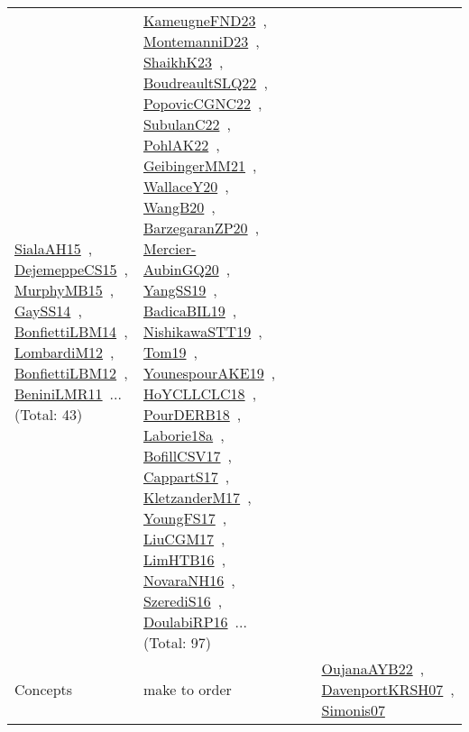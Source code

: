 {\begin{longtable}{lp{3cm}>{\raggedright\arraybackslash}p{6cm}>{\raggedright\arraybackslash}p{6cm}>{\raggedright\arraybackslash}p{8cm}}
\href{works/SialaAH15.pdf}{SialaAH15}~\cite{SialaAH15}, \href{works/DejemeppeCS15.pdf}{DejemeppeCS15}~\cite{DejemeppeCS15}, \href{works/MurphyMB15.pdf}{MurphyMB15}~\cite{MurphyMB15}, \href{works/GaySS14.pdf}{GaySS14}~\cite{GaySS14}, \href{works/BonfiettiLBM14.pdf}{BonfiettiLBM14}~\cite{BonfiettiLBM14}, \href{works/LombardiM12.pdf}{LombardiM12}~\cite{LombardiM12}, \href{works/BonfiettiLBM12.pdf}{BonfiettiLBM12}~\cite{BonfiettiLBM12}, \href{works/BeniniLMR11.pdf}{BeniniLMR11}~\cite{BeniniLMR11}... (Total: 43) & \href{works/KameugneFND23.pdf}{KameugneFND23}~\cite{KameugneFND23}, \href{works/MontemanniD23.pdf}{MontemanniD23}~\cite{MontemanniD23}, \href{works/ShaikhK23.pdf}{ShaikhK23}~\cite{ShaikhK23}, \href{works/BoudreaultSLQ22.pdf}{BoudreaultSLQ22}~\cite{BoudreaultSLQ22}, \href{works/PopovicCGNC22.pdf}{PopovicCGNC22}~\cite{PopovicCGNC22}, \href{works/SubulanC22.pdf}{SubulanC22}~\cite{SubulanC22}, \href{works/PohlAK22.pdf}{PohlAK22}~\cite{PohlAK22}, \href{works/GeibingerMM21.pdf}{GeibingerMM21}~\cite{GeibingerMM21}, \href{works/WallaceY20.pdf}{WallaceY20}~\cite{WallaceY20}, \href{works/WangB20.pdf}{WangB20}~\cite{WangB20}, \href{works/BarzegaranZP20.pdf}{BarzegaranZP20}~\cite{BarzegaranZP20}, \href{works/Mercier-AubinGQ20.pdf}{Mercier-AubinGQ20}~\cite{Mercier-AubinGQ20}, \href{works/YangSS19.pdf}{YangSS19}~\cite{YangSS19}, \href{works/BadicaBIL19.pdf}{BadicaBIL19}~\cite{BadicaBIL19}, \href{works/NishikawaSTT19.pdf}{NishikawaSTT19}~\cite{NishikawaSTT19}, \href{works/Tom19.pdf}{Tom19}~\cite{Tom19}, \href{works/YounespourAKE19.pdf}{YounespourAKE19}~\cite{YounespourAKE19}, \href{works/HoYCLLCLC18.pdf}{HoYCLLCLC18}~\cite{HoYCLLCLC18}, \href{works/PourDERB18.pdf}{PourDERB18}~\cite{PourDERB18}, \href{works/Laborie18a.pdf}{Laborie18a}~\cite{Laborie18a}, \href{works/BofillCSV17.pdf}{BofillCSV17}~\cite{BofillCSV17}, \href{works/CappartS17.pdf}{CappartS17}~\cite{CappartS17}, \href{works/KletzanderM17.pdf}{KletzanderM17}~\cite{KletzanderM17}, \href{works/YoungFS17.pdf}{YoungFS17}~\cite{YoungFS17}, \href{works/LiuCGM17.pdf}{LiuCGM17}~\cite{LiuCGM17}, \href{works/LimHTB16.pdf}{LimHTB16}~\cite{LimHTB16}, \href{works/NovaraNH16.pdf}{NovaraNH16}~\cite{NovaraNH16}, \href{works/SzerediS16.pdf}{SzerediS16}~\cite{SzerediS16}, \href{works/DoulabiRP16.pdf}{DoulabiRP16}~\cite{DoulabiRP16}... (Total: 97)\\
Concepts & make to order &  &  & \href{works/OujanaAYB22.pdf}{OujanaAYB22}~\cite{OujanaAYB22}, \href{works/DavenportKRSH07.pdf}{DavenportKRSH07}~\cite{DavenportKRSH07}, \href{works/Simonis07.pdf}{Simonis07}~\cite{Simonis07}\\

\end{longtable}}
